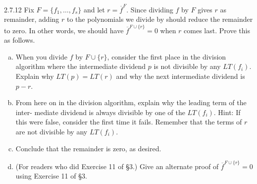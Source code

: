 \documentclass[twoside]{article}
\begin{document}
\newpage

\begin{ejercicio}{2.7.12}
Fix $F = \{ f_1 , \dots , f_s \}$ and let $r = \overline{f}^F$. Since dividing $f$ by $F$ gives $r$ as remainder, adding
$r$ to the polynomials we divide by should reduce the remainder to zero. In other words,
we should have $\overline{f}^{F∪\{r\}}
= 0$ when $r$ comes last. Prove this as follows.
\begin{enumerate}[a.]
\item When you divide $f$ by $F ∪\{r\}$, consider the first place in the division algorithm where
the intermediate dividend $p$ is not divisible by any $LT ( f_i )$. Explain why $LT (p) =
LT (r)$ and why the next intermediate dividend is $p − r$.
\item From here on in the division algorithm, explain why the leading term of the inter-
mediate dividend is always divisible by one of the $LT ( f_i )$. Hint: If this were false,
consider the first time it fails. Remember that the terms of $r$ are not divisible by any
$LT ( f_i )$.
\item Conclude that the remainder is zero, as desired.
\item (For readers who did Exercise 11 of §3.) Give an alternate proof of $\overline{f}^{F∪\{r\}}
= 0$ using
Exercise 11 of §3.
\end{enumerate}
\end{ejercicio}
\end{document}
